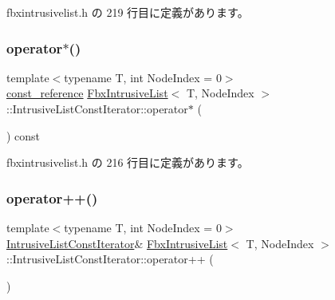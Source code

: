  fbxintrusivelist.\+h の 219 行目に定義があります。

\mbox{\label{class_fbx_intrusive_list_1_1_intrusive_list_const_iterator_a32db6e7ef6d2f4404db030a0388fd4c9}} 
\subsubsection{\texorpdfstring{operator$\ast$()}{operator*()}}
{\footnotesize\ttfamily template$<$typename T, int Node\+Index = 0$>$ \\
\hyperlink{class_fbx_intrusive_list_a21904cb72c0ccae9d5c0b9f171befeb8}{const\+\_\+reference} \hyperlink{class_fbx_intrusive_list}{Fbx\+Intrusive\+List}$<$ T, Node\+Index $>$\+::Intrusive\+List\+Const\+Iterator\+::operator$\ast$ (\begin{DoxyParamCaption}{ }\end{DoxyParamCaption}) const\hspace{0.3cm}{\ttfamily [inline]}}



 fbxintrusivelist.\+h の 216 行目に定義があります。

\mbox{\label{class_fbx_intrusive_list_1_1_intrusive_list_const_iterator_acec5cc7484c22f7c9a75c98f1281397d}} 
\subsubsection{\texorpdfstring{operator++()}{operator++()}\hspace{0.1cm}{\footnotesize\ttfamily [1/2]}}
{\footnotesize\ttfamily template$<$typename T, int Node\+Index = 0$>$ \\
\hyperlink{class_fbx_intrusive_list_1_1_intrusive_list_const_iterator}{Intrusive\+List\+Const\+Iterator}\& \hyperlink{class_fbx_intrusive_list}{Fbx\+Intrusive\+List}$<$ T, Node\+Index $>$\+::Intrusive\+List\+Const\+Iterator\+::operator++ (\begin{DoxyParamCaption}{ }\end{DoxyParamCaption})\hspace{0.3cm}{\ttfamily [inline]}}



